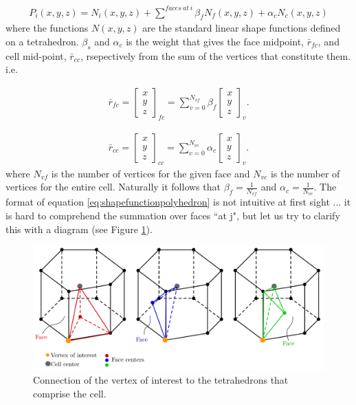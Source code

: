 \documentclass[11pt,letterpaper,titlepage]{article}
\newcommand{\beqn}{\begin{equation}
	\begin{aligned}}
\newcommand{\eeqn}{\end{aligned}
	\end{equation}}
\begin{document}
\beqn \label{eq:shapefunctionpolyhedron}
P_i(x,y,z) = N_i (x,y,z) +\sum^{faces \ at \ i}  \beta_f N_f(x,y,z) + \alpha_c N_c(x,y,z)
\eeqn 
\newline
where the functions $N(x,y,z)$ are the standard linear shape functions defined on a tetrahedron. $\beta_s$ and $\alpha_c$  is the weight that gives the face midpoint, $\bar{r}_{fc}$, and cell mid-point, $\bar{r}_{cc}$, rsepectively from the sum of the vertices that constitute them. i.e.

\beqn 
\bar{r}_{fc} =
\begin{bmatrix}
x \\ y \\ z
\end{bmatrix}_{fc}
= \sum_{v=0}^{N_{vf}} \beta_f
\begin{bmatrix}
x \\ y \\z
\end{bmatrix}_{v}.
\eeqn

\beqn 
\bar{r}_{cc} =
\begin{bmatrix}
x \\ y \\ z
\end{bmatrix}_{cc}
= \sum_{v=0}^{N_{vc}} \alpha_c
\begin{bmatrix}
x \\ y \\z
\end{bmatrix}_{v}.
\eeqn
\newline
where $N_{vf}$ is the number of vertices for the given face and $N_{vc}$ is the number of vertices for the entire cell. Naturally it follows that $\beta_f = \frac{1}{N_{vf}}$ and $\alpha_c = \frac{1}{N_{vc}}$. The format of equation \ref{eq:shapefunctionpolyhedron} is not intuitive at first sight ... it is hard to comprehend the summation over faces ``at j", but let us try to clarify this with a diagram (see Figure \ref{fig:threedtetrahedral}).

\begin{figure}[H]
\centering
\includegraphics[width=1\linewidth]{LatexDraw/ThreeDTetrahedral}
\caption{Connection of the vertex of interest to the tetrahedrons that comprise the cell.}
\label{fig:threedtetrahedral}
\end{figure}
\end{document}
